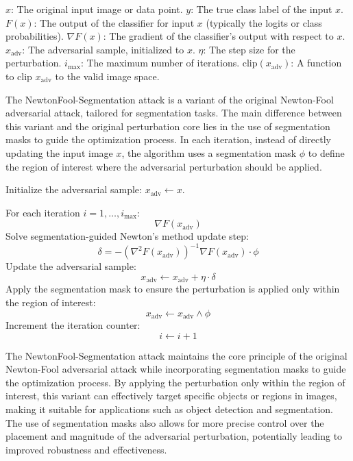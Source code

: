 $x$: The original input image or data point.
$y$: The true class label of the input $x$.
$F(x)$: The output of the classifier for input $x$ (typically the logits or class probabilities).
$\nabla F(x)$: The gradient of the classifier's output with respect to $x$.
$x_{\text{adv}}$: The adversarial sample, initialized to $x$.
$\eta$: The step size for the perturbation.
$i_{\text{max}}$: The maximum number of iterations.
$\text{clip}(x_{\text{adv}})$: A function to clip $x_{\text{adv}}$ to the valid image space.

The NewtonFool-Segmentation attack is a variant of the original Newton-Fool adversarial attack, tailored for segmentation tasks. The main difference between this variant and the original perturbation core lies in the use of segmentation masks to guide the optimization process. In each iteration, instead of directly updating the input image $x$, the algorithm uses a segmentation mask $\phi$ to define the region of interest where the adversarial perturbation should be applied.

Initialize the adversarial sample:
\( x_{\text{adv}} \leftarrow x \).

For each iteration \( i = 1, \ldots, i_{\text{max}} \):
\[
\nabla F(x_{\text{adv}})
\]
Solve segmentation-guided Newton's method update step:
\[
\delta = - (\nabla^2 F(x_{\text{adv}}))^{-1} \nabla F(x_{\text{adv}}) \cdot \phi
\]
Update the adversarial sample:
\[
x_{\text{adv}} \leftarrow x_{\text{adv}} + \eta \cdot \delta
\]
Apply the segmentation mask to ensure the perturbation is applied only within the region of interest:
\[
x_{\text{adv}} \leftarrow x_{\text{adv}} \wedge \phi
\]
Increment the iteration counter:
\[
i \leftarrow i + 1
\]

The NewtonFool-Segmentation attack maintains the core principle of the original Newton-Fool adversarial attack while incorporating segmentation masks to guide the optimization process. By applying the perturbation only within the region of interest, this variant can effectively target specific objects or regions in images, making it suitable for applications such as object detection and segmentation. The use of segmentation masks also allows for more precise control over the placement and magnitude of the adversarial perturbation, potentially leading to improved robustness and effectiveness.